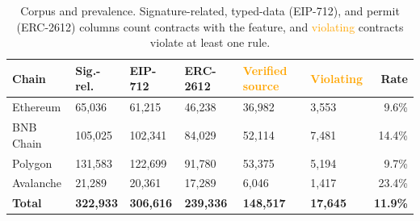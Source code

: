 \documentclass[10pt,conference]{IEEEtran}
\newcommand{\AS}[1]{\textcolor{orange}{#1}}
\begin{document}
\begin{table}[tb]
\centering
\scriptsize
\caption{Corpus and prevalence. Signature-related, typed-data (EIP-712), and permit (ERC-2612) columns count contracts with the feature, and \AS{violating} contracts violate at least one rule.}
\label{tab:corpus}
\setlength{\tabcolsep}{2.6pt}
\begin{tabular}{@{}p{1.2cm}p{1.2cm}p{1cm}p{1cm}p{1cm}p{1cm}r@{}}
\toprule
\textbf{Chain} & \textbf{Sig.-rel.} & \textbf{EIP-712} & \textbf{ERC-2612} & \textbf{\AS{Verified source}} & \textbf{\AS{Violating}} & \textbf{Rate} \\
\midrule
Ethereum  & 65,036  & 61,215  & 46,238 & 36,982  & 3,553  & 9.6\%  \\
BNB Chain & 105,025 & 102,341 & 84,029 & 52,114  & 7,481  & 14.4\% \\
Polygon   & 131,583 & 122,699 & 91,780 & 53,375  & 5,194  & 9.7\%  \\
Avalanche & 21,289  & 20,361  & 17,289 & 6,046   & 1,417  & 23.4\% \\
\midrule
\textbf{Total} & \textbf{322,933} & \textbf{306,616} & \textbf{239,336} & \textbf{148,517} & \textbf{17,645} & \textbf{11.9\%} \\
\bottomrule
\end{tabular}
\end{table}
\end{document}
